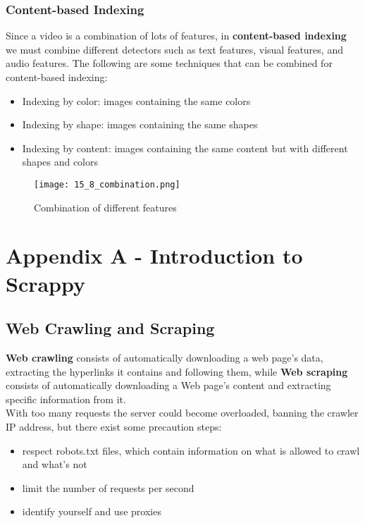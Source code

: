 \documentclass{article}
\begin{document}
\subsubsection{Content-based Indexing}
Since a video is a combination of lots of features, in \textbf{content-based indexing} we must combine different detectors such as text features, visual features, and audio features. The following are some techniques that can be combined for content-based indexing:
\begin{itemize}
    \item Indexing by color: images containing the same colors
    \item Indexing by shape: images containing the same shapes
    \item Indexing by content: images containing the same content but with different shapes and colors
\end{itemize}
\begin{figure}[H]
    \centering
    \texttt{[image: 15\_8\_combination.png]}
    \caption{Combination of different features}
\end{figure}

\section{Appendix A - Introduction to Scrappy}
\subsection{Web Crawling and Scraping}
\textbf{Web crawling} consists of automatically downloading a web page's data, extracting the hyperlinks it contains and following them, while
\textbf{Web scraping} consists of automatically downloading a Web page's content and extracting specific information from it. \\
With too many requests the server could become overloaded, banning the crawler IP address, but there exist some precaution steps:
\begin{itemize}
    \item respect robots.txt files, which contain information on what is allowed to crawl and what's not
    \item limit the number of requests per second
    \item identify yourself and use proxies
\end{itemize}
\end{document}
